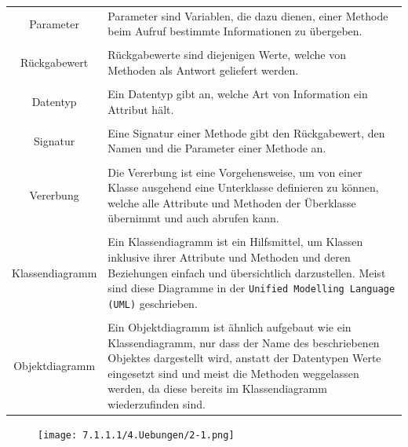 \documentclass{scrartcl}   %
\begin{document}
\begin{table}[ht]
\centering
\begin{tabular}{c|p{10cm}}
    \\Parameter & Parameter sind Variablen, die dazu dienen, einer Methode beim Aufruf bestimmte Informationen zu übergeben.\footnotemark\\

    \\Rückgabewert & Rückgabewerte sind diejenigen Werte, welche von Methoden als Antwort geliefert werden.\\

	\\Datentyp & Ein Datentyp gibt an, welche Art von Information ein Attribut hält.\\
	
	\\Signatur & Eine Signatur einer Methode gibt den Rückgabewert, den Namen und die Parameter einer Methode an.\\

	\\Vererbung & Die Vererbung ist eine Vorgehensweise, um von einer Klasse ausgehend eine Unterklasse definieren zu können, welche alle Attribute und Methoden der Überklasse übernimmt und auch abrufen kann.\\

	\\Klassendiagramm & Ein Klassendiagramm ist ein Hilfsmittel, um Klassen inklusive ihrer Attribute und Methoden und deren Beziehungen einfach und übersichtlich darzustellen. Meist sind diese Diagramme in der \texttt{Unified Modelling Language (UML)} geschrieben.\\

	\\Objektdiagramm & Ein Objektdiagramm ist ähnlich aufgebaut wie ein Klassendiagramm, nur dass der Name des beschriebenen Objektes dargestellt wird, anstatt der Datentypen Werte eingesetzt sind und meist die Methoden weggelassen werden, da diese bereits im Klassendiagramm wiederzufinden sind.\\
\end{tabular}
\end{table}


\newpage

\begin{figure}[ht]
    \centering
	\texttt{[image: 7.1.1.1/4.Uebungen/2-1.png]}
\end{figure}
\end{document}
